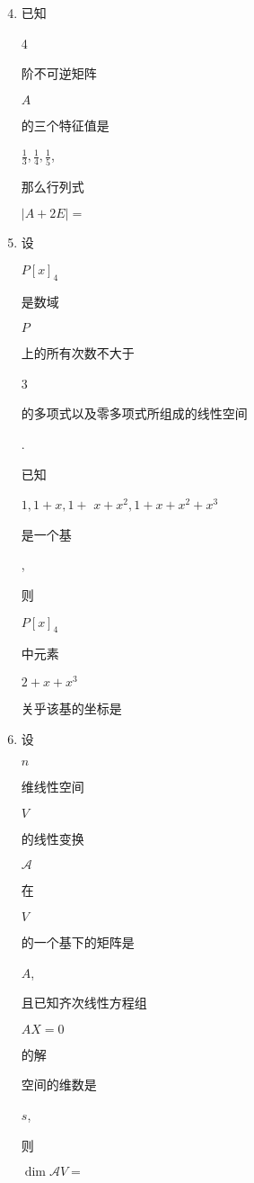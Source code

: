 \documentclass[10pt]{article}
\begin{document}
\begin{enumerate}
  \setcounter{enumi}{3}
  \item \begin{CJK}{UTF8}{mj}已知\end{CJK} 4 \begin{CJK}{UTF8}{mj}阶不可逆矩阵\end{CJK} $A$ \begin{CJK}{UTF8}{mj}的三个特征值是\end{CJK} $\frac{1}{3}, \frac{1}{4}, \frac{1}{5}$, \begin{CJK}{UTF8}{mj}那么行列式\end{CJK} $|A+2 E|=$

  \item \begin{CJK}{UTF8}{mj}设\end{CJK} $P[x]_{4}$ \begin{CJK}{UTF8}{mj}是数域\end{CJK} $P$ \begin{CJK}{UTF8}{mj}上的所有次数不大于\end{CJK} 3 \begin{CJK}{UTF8}{mj}的多项式以及零多项式所组成的线性空间\end{CJK}. \begin{CJK}{UTF8}{mj}已知\end{CJK} $1,1+x, 1+$ $x+x^{2}, 1+x+x^{2}+x^{3}$ \begin{CJK}{UTF8}{mj}是一个基\end{CJK}, \begin{CJK}{UTF8}{mj}则\end{CJK} $P[x]_{4}$ \begin{CJK}{UTF8}{mj}中元素\end{CJK} $2+x+x^{3}$ \begin{CJK}{UTF8}{mj}关乎该基的坐标是\end{CJK}

  \item \begin{CJK}{UTF8}{mj}设\end{CJK} $n$ \begin{CJK}{UTF8}{mj}维线性空间\end{CJK} $V$ \begin{CJK}{UTF8}{mj}的线性变换\end{CJK} $\mathscr{A}$ \begin{CJK}{UTF8}{mj}在\end{CJK} $V$ \begin{CJK}{UTF8}{mj}的一个基下的矩阵是\end{CJK} $A$, \begin{CJK}{UTF8}{mj}且已知齐次线性方程组\end{CJK} $A X=0$ \begin{CJK}{UTF8}{mj}的解\end{CJK} \begin{CJK}{UTF8}{mj}空间的维数是\end{CJK} $s$, \begin{CJK}{UTF8}{mj}则\end{CJK} $\operatorname{dim} \mathscr{A} V=$

\end{enumerate}
\end{document}
